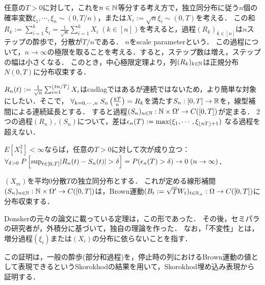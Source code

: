 \documentclass[uplatex,dvipdfmx]{jsreport}
\begin{document}
\begin{notation}[酔歩]
    任意の$T>0$に対して，これを$n\in\mathbb{N}$等分する考え方で，独立同分布に従う$n$個の確率変数$\xi_1,\cdots,\xi_n\sim(0,T/n)$，または$X_i:=\sqrt{n}\xi_i\sim(0,T)$を考える．
    この和$R_k:=\sum_{i=1}^k\xi_i=\frac{1}{\sqrt{n}}\sum^k_{i=1}X_i\;(k\in[n])$を考えると，過程$(R_k)_{k\in[n]}$は$n$ステップの酔歩で，分散が$T/n$である．
    $n$をscale parameterという．
    この過程について，$n\to\infty$の極限を取ることを考える．すると，ステップ数は増え，ステップの幅は小さくなる．
    このとき，中心極限定理より，列$(R_k)_{k\in\mathbb{N}}$は正規分布$N(0,T)$に分布収束する．
\end{notation}

\begin{discussion}[酔歩の線形補間]
    $R_n(t):=\frac{1}{\sqrt{n}}\sum_{i=1}^{\lfloor tn/T\rfloor}X_i$はcadlagではあるが連続ではないため，より簡単な対象にしたい．そこで，
    $\forall_{k=0,\cdots,n}\;S_n\left(\frac{kT}{n}\right)=R_k$を満たす$S_n:[0,T]\to\mathbb{R}$を，線型補間による連続延長とする．
    すると過程$(S_n)_{n\in\mathbb{N}}:\mathbb{N}\times\Omega'\to C([0,T])$が定まる．
    2つの過程$(R_n),(S_n)$について，差は$\epsilon_n(T):=\max(\xi_1,\cdots,\xi_{\lfloor nT\rfloor+1})$
    なる過程を超えない．
\end{discussion}

\begin{proposition}
    $E[X_1^2]<\infty$ならば，任意の$T>0$に対して次が成り立つ：$\forall_{\delta>0}\;P\left[\sup_{t\in[0,T]}\lvert R_n(t)-S_n(t)\rvert>\delta\right]=P(\epsilon_n(T)>\delta)\to0\;(n\to\infty)$．
\end{proposition}

\begin{theorem}
    $(X_m)$を平均$0$分散$T$の独立同分布とする．
    これが定める線形補間$(S_n)_{n\in\mathbb{N}}:\mathbb{N}\times\Omega'\to C([0,T])$は，Brown運動$(B_t:=\sqrt{T}W_t)_{t\in\mathbb{R}_+}:\Omega\to C([0,T])$に分布収束する．
\end{theorem}
\begin{remark}
    Donskerの元々の論文に載っている定理は，この形であった．
    その後，セミパラの研究者が，外積分に基づいて，独自の理論を作った．
    なお，「不変性」とは，増分過程$(\xi_i)$または$(X_i)$の分布に依らないことを指す．
\end{remark}
\begin{remarks}
    この証明は，一般の酔歩(部分和過程)を，停止時の列におけるBrown運動の値として表現できるというSkorokhodの結果を用いて，Skorokhod埋め込み表現から証明する．
\end{remarks}
\end{document}
